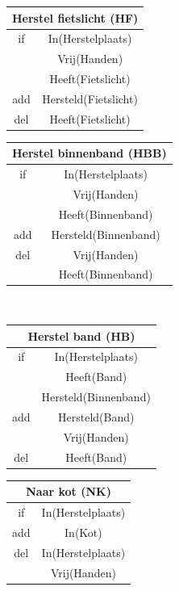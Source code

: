 \documentclass{article}
\begin{document}
\begin{figure}[H]
\begin{tabular}{|c|c|}
    \multicolumn{2}{c}{Herstel fietslicht (HF)}\\
    \hline
    if & In(Herstelplaats)\\
       & Vrij(Handen)\\
       & Heeft(Fietslicht)\\
    \hline
    add & Hersteld(Fietslicht)\\
    \hline
    del & Heeft(Fietslicht)\\
    \hline
\end{tabular}
\hspace{0.25cm}
\begin{tabular}{|c|c|}
    \multicolumn{2}{c}{Herstel binnenband (HBB)}\\
    \hline
    if & In(Herstelplaats)\\
       & Vrij(Handen)\\
       & Heeft(Binnenband)\\
    \hline
    add & Hersteld(Binnenband)\\
    \hline
    del & Vrij(Handen)\\
        & Heeft(Binnenband)\\
    \hline
\end{tabular}
\\\vspace{0.25cm}
\begin{tabular}{|c|c|}
    \multicolumn{2}{c}{Herstel band (HB)}\\
    \hline
    if & In(Herstelplaats)\\
       & Heeft(Band)\\
       & Hersteld(Binnenband)\\
    \hline
    add & Hersteld(Band)\\
        & Vrij(Handen)\\
    \hline
    del & Heeft(Band)\\
    \hline
\end{tabular}
\hspace{0.25cm}
\begin{tabular}{|c|c|}
    \multicolumn{2}{c}{Naar kot (NK)}\\
    \hline
    if & In(Herstelplaats)\\
    \hline
    add & In(Kot)\\
    \hline
    del & In(Herstelplaats)\\
        & Vrij(Handen)\\
    \hline
\end{tabular}

\end{figure}
\end{document}
